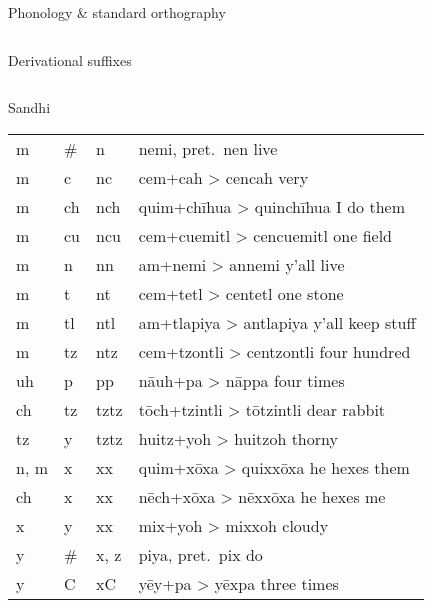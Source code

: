 \documentclass[12pt]{beamer}
\newcommand{\nah}[1]{\textcolor{nahgrn}{#1}}
\newcommand{\trs}[1]{\textcolor{nahblu}{#1}}
\begin{document}
\begin{frame}
\begin{columns}[t]
\begin{column}{.22\linewidth}
\begin{block}{Phonology \& standard orthography}
\begin{threeparttable}
\begin{tablenotes}
\begin{frame}
\begin{columns}[t]
\begin{column}{.22\linewidth}
\begin{block}{Derivational suffixes}
\begin{threeparttable}
\begin{multicols}{2}
\begin{itemize}
\begin{column}{.26\linewidth}
\begin{block}{Sandhi}
\begin{threeparttable}
\begin{tabular}{l@{+ }l@{> }ll}
            \nah{m}    & \nah{\#}  & \nah{n}               & \nah{nemi}, pret.~\nah{nen} \trs{live}                          \\
            \nah{m}    & \nah{c}   & \nah{nc}              & \nah{cem}+\nah{cah} > \nah{cencah} \trs{very}                   \\
            \nah{m}    & \nah{ch}  & \nah{nch}             & \nah{quim}+\nah{chīhua} > \nah{quinchīhua} \trs{I do them}      \\
            \nah{m}    & \nah{cu}  & \nah{ncu}             & \nah{cem}+\nah{cuemitl} > \nah{cencuemitl} \trs{one field}      \\
            \nah{m}    & \nah{n}   & \nah{nn}              & \nah{am}+\nah{nemi} > \nah{annemi} \trs{y'all live}             \\
            \nah{m}    & \nah{t}   & \nah{nt}              & \nah{cem}+\nah{tetl} > \nah{centetl} \trs{one stone}            \\
            \nah{m}    & \nah{tl}  & \nah{ntl}             & \nah{am}+\nah{tlapiya} > \nah{antlapiya} \trs{y'all keep stuff} \\
            \nah{m}    & \nah{tz}  & \nah{ntz}             & \nah{cem}+\nah{tzontli} > \nah{centzontli} \trs{four hundred}   \\
            \nah{uh}   & \nah{p}   & \nah{pp}              & \nah{nāuh}+\nah{pa} > \nah{nāppa} \trs{four times}              \\
            \nah{ch}   & \nah{tz}  & \nah{tztz}\tnote{1}   & \nah{tōch}+\nah{tzintli} > \nah{tōtzintli} \trs{dear rabbit}    \\
            \nah{tz}   & \nah{y}   & \nah{tztz}\tnote{1}   & \nah{huitz}+\nah{yoh} > \nah{huitzoh} \trs{thorny}              \\
            \nah{n, m} & \nah{x}   & \nah{xx}\tnote{1}     & \nah{quim}+\nah{xōxa} > \nah{quixxōxa} \trs{he hexes them}      \\
            \nah{ch}   & \nah{x}   & \nah{xx}\tnote{1}     & \nah{nēch}+\nah{xōxa} > \nah{nēxxōxa} \trs{he hexes me}         \\
            \nah{x}    & \nah{y}   & \nah{xx}\tnote{1}     & \nah{mix}+\nah{yoh} > \nah{mixxoh} \trs{cloudy}                 \\
            \nah{y}    & \nah{\#}  & \nah{x, z}\tnote{2}{} & \nah{piya}, pret.~\nah{pix} \trs{do}                            \\
            \nah{y}    & \nah{C}   & \nah{xC}              & \nah{yēy}+\nah{pa} > \nah{yēxpa} \trs{three times}              \\

\end{tabular}
\end{threeparttable}
\end{block}
\end{column}
\end{itemize}
\end{multicols}
\end{threeparttable}
\end{block}
\end{column}
\end{columns}
\end{frame}
\end{tablenotes}
\end{threeparttable}
\end{block}
\end{column}
\end{columns}
\end{frame}
\end{document}
